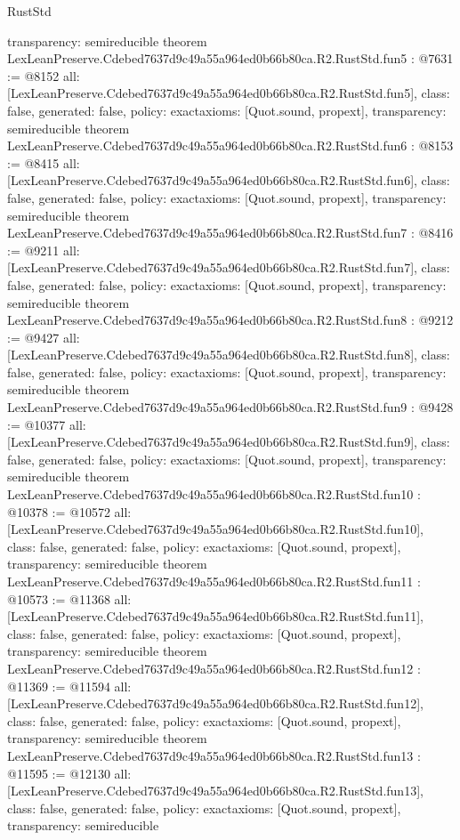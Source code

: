\begin{lexlean}{RustStd}
\begin{coremodule}
{  transparency: semireducible
}
theorem LexLeanPreserve.Cdebed7637d9c49a55a964ed0b66b80ca.R2.RustStd.fun5 : @7631 := @8152 {
  all: [LexLeanPreserve.Cdebed7637d9c49a55a964ed0b66b80ca.R2.RustStd.fun5],
  class: false,
  generated: false,
  policy: exact{axioms: [Quot.sound, propext]},
  transparency: semireducible
}
theorem LexLeanPreserve.Cdebed7637d9c49a55a964ed0b66b80ca.R2.RustStd.fun6 : @8153 := @8415 {
  all: [LexLeanPreserve.Cdebed7637d9c49a55a964ed0b66b80ca.R2.RustStd.fun6],
  class: false,
  generated: false,
  policy: exact{axioms: [Quot.sound, propext]},
  transparency: semireducible
}
theorem LexLeanPreserve.Cdebed7637d9c49a55a964ed0b66b80ca.R2.RustStd.fun7 : @8416 := @9211 {
  all: [LexLeanPreserve.Cdebed7637d9c49a55a964ed0b66b80ca.R2.RustStd.fun7],
  class: false,
  generated: false,
  policy: exact{axioms: [Quot.sound, propext]},
  transparency: semireducible
}
theorem LexLeanPreserve.Cdebed7637d9c49a55a964ed0b66b80ca.R2.RustStd.fun8 : @9212 := @9427 {
  all: [LexLeanPreserve.Cdebed7637d9c49a55a964ed0b66b80ca.R2.RustStd.fun8],
  class: false,
  generated: false,
  policy: exact{axioms: [Quot.sound, propext]},
  transparency: semireducible
}
theorem LexLeanPreserve.Cdebed7637d9c49a55a964ed0b66b80ca.R2.RustStd.fun9 : @9428 := @10377 {
  all: [LexLeanPreserve.Cdebed7637d9c49a55a964ed0b66b80ca.R2.RustStd.fun9],
  class: false,
  generated: false,
  policy: exact{axioms: [Quot.sound, propext]},
  transparency: semireducible
}
theorem LexLeanPreserve.Cdebed7637d9c49a55a964ed0b66b80ca.R2.RustStd.fun10 : @10378 := @10572 {
  all: [LexLeanPreserve.Cdebed7637d9c49a55a964ed0b66b80ca.R2.RustStd.fun10],
  class: false,
  generated: false,
  policy: exact{axioms: [Quot.sound, propext]},
  transparency: semireducible
}
theorem LexLeanPreserve.Cdebed7637d9c49a55a964ed0b66b80ca.R2.RustStd.fun11 : @10573 := @11368 {
  all: [LexLeanPreserve.Cdebed7637d9c49a55a964ed0b66b80ca.R2.RustStd.fun11],
  class: false,
  generated: false,
  policy: exact{axioms: [Quot.sound, propext]},
  transparency: semireducible
}
theorem LexLeanPreserve.Cdebed7637d9c49a55a964ed0b66b80ca.R2.RustStd.fun12 : @11369 := @11594 {
  all: [LexLeanPreserve.Cdebed7637d9c49a55a964ed0b66b80ca.R2.RustStd.fun12],
  class: false,
  generated: false,
  policy: exact{axioms: [Quot.sound, propext]},
  transparency: semireducible
}
theorem LexLeanPreserve.Cdebed7637d9c49a55a964ed0b66b80ca.R2.RustStd.fun13 : @11595 := @12130 {
  all: [LexLeanPreserve.Cdebed7637d9c49a55a964ed0b66b80ca.R2.RustStd.fun13],
  class: false,
  generated: false,
  policy: exact{axioms: [Quot.sound, propext]},
  transparency: semireducible
}
\end{coremodule}
\end{lexlean}
